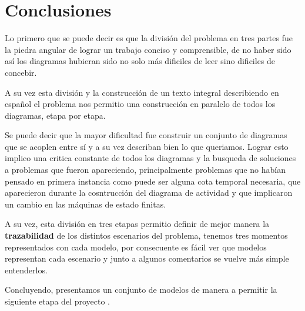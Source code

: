 \section{Conclusiones}

Lo primero que se puede decir es que la división del problema en tres partes fue la piedra angular de lograr un trabajo conciso y comprensible, de no haber sido así los diagramas hubieran sido no solo más dificiles de leer sino dificiles de concebir.

A su vez esta división y la construcción de un texto integral describiendo en español el problema nos permitio una construcción en paralelo de todos los diagramas, etapa por etapa. 

Se puede decir que la mayor dificultad fue construir un conjunto de diagramas que se acoplen entre sí y a su vez describan bien lo que queriamos. Lograr esto implico una critica constante de todos los diagramas y la busqueda de soluciones a problemas que fueron apareciendo, principalmente problemas que no habían pensado en primera instancia como puede ser alguna cota temporal necesaria, que aparecieron durante la cosntrucción del diagrama de actividad y que implicaron un cambio en las máquinas de estado finitas.

A su vez, esta división en tres etapas permitio definir de mejor manera la \textbf{trazabilidad} de los distintos escenarios del problema, tenemos tres momentos representados con cada modelo, por consecuente es fácil ver que modelos representan cada escenario y junto a algunos comentarios se vuelve más simple entenderlos.

Concluyendo, presentamos un conjunto de modelos de manera a permitir la siguiente etapa del proyecto	.